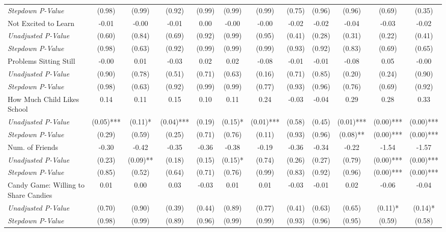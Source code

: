 \begin{tabular}{l c c c c c c c c c c c}
\quad \textit{Stepdown P-Value} & (0.98) & (0.99) & (0.92) & (0.99) & (0.99) & (0.99) & (0.75) & (0.96) & (0.96) & (0.69) & (0.35) \\
Not Excited to Learn & -0.01 & -0.00 & -0.01 & 0.00 & -0.00 & -0.00 & -0.02 & -0.02 & -0.04 & -0.03 & -0.02 \\
\quad \textit{Unadjusted P-Value} & (0.60) & (0.84) & (0.69) & (0.92) & (0.99) & (0.95) & (0.41) & (0.28) & (0.31) & (0.22) & (0.41) \\
\quad \textit{Stepdown P-Value} & (0.98) & (0.63) & (0.92) & (0.99) & (0.99) & (0.99) & (0.93) & (0.92) & (0.83) & (0.69) & (0.65) \\
Problems Sitting Still & -0.00 & 0.01 & -0.03 & 0.02 & 0.02 & -0.08 & -0.01 & -0.01 & -0.08 & 0.05 & -0.00 \\
\quad \textit{Unadjusted P-Value} & (0.90) & (0.78) & (0.51) & (0.71) & (0.63) & (0.16) & (0.71) & (0.85) & (0.20) & (0.24) & (0.90) \\
\quad \textit{Stepdown P-Value} & (0.98) & (0.63) & (0.92) & (0.99) & (0.99) & (0.77) & (0.93) & (0.96) & (0.76) & (0.69) & (0.92) \\
How Much Child Likes School & 0.14 & 0.11 & 0.15 & 0.10 & 0.11 & 0.24 & -0.03 & -0.04 & 0.29 & 0.28 & 0.33 \\
\quad \textit{Unadjusted P-Value} & (0.05)*** & (0.11)* & (0.04)*** & (0.19) & (0.15)* & (0.01)*** & (0.58) & (0.45) & (0.01)*** & (0.00)*** & (0.00)*** \\
\quad \textit{Stepdown P-Value} & (0.29) & (0.59) & (0.25) & (0.71) & (0.76) & (0.11) & (0.93) & (0.96) & (0.08)** & (0.00)*** & (0.00)*** \\
Num. of Friends & -0.30 & -0.42 & -0.35 & -0.36 & -0.38 & -0.19 & -0.36 & -0.34 & -0.22 & -1.54 & -1.57 \\
\quad \textit{Unadjusted P-Value} & (0.23) & (0.09)** & (0.18) & (0.15) & (0.15)* & (0.74) & (0.26) & (0.27) & (0.79) & (0.00)*** & (0.00)*** \\
\quad \textit{Stepdown P-Value} & (0.85) & (0.52) & (0.64) & (0.71) & (0.76) & (0.99) & (0.83) & (0.92) & (0.96) & (0.00)*** & (0.00)*** \\
Candy Game: Willing to Share Candies & 0.01 & 0.00 & 0.03 & -0.03 & 0.01 & 0.01 & -0.03 & -0.01 & 0.02 & -0.06 & -0.04 \\
\quad \textit{Unadjusted P-Value} & (0.70) & (0.90) & (0.39) & (0.44) & (0.89) & (0.77) & (0.41) & (0.63) & (0.65) & (0.11)* & (0.14)* \\
\quad \textit{Stepdown P-Value} & (0.98) & (0.99) & (0.89) & (0.96) & (0.99) & (0.99) & (0.93) & (0.96) & (0.95) & (0.59) & (0.58) \\
\bottomrule
\end{tabular}
